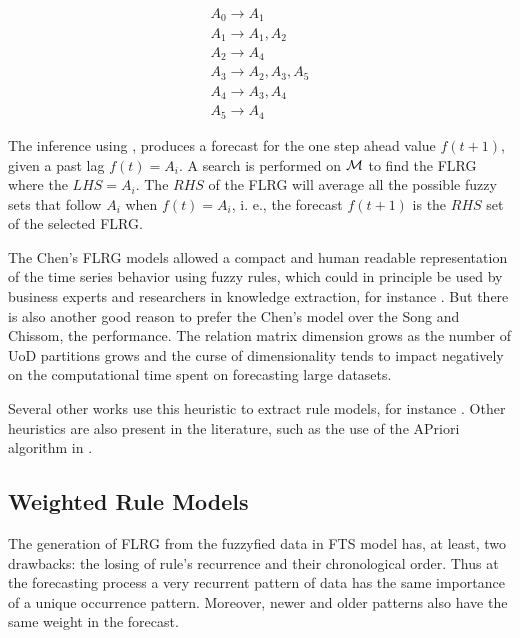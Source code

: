 \begin{equation}
\begin{array}{l}
A_0 \rightarrow A_1 \\
A_1 \rightarrow A_1, A_2 \\
A_2 \rightarrow A_4 \\
A_3 \rightarrow A_2,A_3,A_5 \\
A_4 \rightarrow A_3, A_4 \\
A_5 \rightarrow A_4 
\end{array}
\label{equ:chen_flrg}
\end{equation}

The inference using \citep{chen1996forecasting}, produces a forecast for the one step ahead value $f(t+1)$, given a past lag $f(t) = A_i$. A search is performed on $\mathcal{M}$ to find the FLRG where the $LHS = A_i$. The $RHS$ of the FLRG will average all the possible fuzzy sets that follow $A_i$ when $f(t) = A_i$, i. e., the forecast $f(t+1)$ is the $RHS$ set of  the selected FLRG.

The Chen's FLRG models allowed a compact and human readable representation of the time series behavior using fuzzy rules, which could in principle be used by business experts and researchers in knowledge extraction, for instance   \cite{Lee2006}. But there is also another good reason to prefer the Chen's model over the Song and Chissom, the performance. The relation matrix dimension grows as the number of UoD partitions grows and the curse of dimensionality tends to impact negatively on the computational time spent on forecasting large datasets. 

Several other works use this heuristic to extract rule models, for instance \cite{Chen2002, Huarng2004, Lee2006, Li2008b, Hsu2010, Bahrepour2011, Huang2011, Sun2015, Sadaei2016, Lee2017, Yang2017,  Bose2017, CarvalhoJr2017}. Other heuristics are also present in the literature, such as the use of the APriori algorithm in \cite{Cheng2018}.

%

\subsection{Weighted Rule Models}
\label{sec:fts_weighted}

The generation of FLRG from the fuzzyfied data in  FTS model has, at least, two drawbacks: the losing of rule's recurrence and their chronological order. Thus at the forecasting process a very recurrent pattern of data has the same importance of a unique occurrence pattern. Moreover, newer and older patterns also have the same weight in the forecast. 

